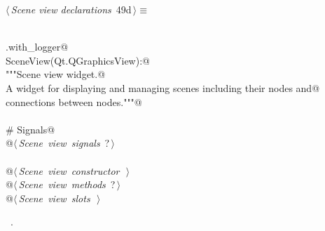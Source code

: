 \documentclass[
    a4paper,      %
    10pt,         %
    openright,    %
    notitlepage,  %
    parskip=half, %
]{scrreprt}       %
\theoremstyle{definition}                    %
\begin{document}
\begin{flushleft} \small
\begin{minipage}{\linewidth}\label{scrap72}\raggedright\small
{} $\langle\,${\itshape Scene view declarations}\nobreak\ {\footnotesize {49d}}$\,\rangle\equiv$
\vspace{-1exm}
\begin{list}{}{} \item
\mbox{}\lstinline@@\\
\mbox{}\lstinline@common.with_logger@\\
\mbox{}\lstinline@class SceneView(Qt.QGraphicsView):@\\
\mbox{}\lstinline@    """Scene view widget.@\\
\mbox{}\lstinline@    A widget for displaying and managing scenes including their nodes and@\\
\mbox{}\lstinline@    connections between nodes."""@\\
\mbox{}\lstinline@@\\
\mbox{}\lstinline@    # Signals@\\
\mbox{}\lstinline@    @\hbox{$\langle\,${\itshape Scene view signals}\nobreak\ {\footnotesize ?}$\,\rangle$}\lstinline@@\\
\mbox{}\lstinline@@\\
\mbox{}\lstinline@    @\hbox{$\langle\,${\itshape Scene view constructor}\nobreak\ {\footnotesize {}}$\,\rangle$}\lstinline@@\\
\mbox{}\lstinline@    @\hbox{$\langle\,${\itshape Scene view methods}\nobreak\ {\footnotesize ?}$\,\rangle$}\lstinline@@\\
\mbox{}\lstinline@    @\hbox{$\langle\,${\itshape Scene view slots}\nobreak\ {\footnotesize {}}$\,\rangle$}\lstinline@@\\
\mbox{}\lstinline@@{\NWsep}
\end{list}
\vspace{-1.5ex}
\footnotesize
\begin{list}{}{\setlength{\itemsep}{-\parsep}\setlength{\itemindent}{-\leftmargin}}
\item \NWtxtMacroRefIn\ .

\item{}
\end{list}
\end{minipage}\vspace{4ex}
\end{flushleft}
\end{document}
